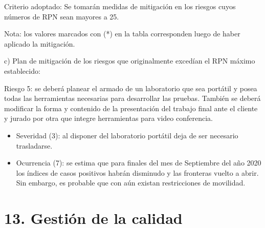 \documentclass[11pt]{charter}
\begin{document}
Criterio adoptado: 
Se tomarán medidas de mitigación en los riesgos cuyos números de RPN sean mayores a 25.

Nota: los valores marcados con (*) en la tabla corresponden luego de haber aplicado la mitigación.

c) Plan de mitigación de los riesgos que originalmente excedían el RPN máximo establecido:
 
Riesgo 5: se deberá planear el armado de un laboratorio que sea portátil y posea todas las herramientas necesarias para desarrollar las pruebas. También se deberá modificar la forma y contenido de la presentación del trabajo final ante el cliente y jurado por otra que integre herramientas para video conferencia.
\begin{itemize}
	\item Severidad (3): al disponer del laboratorio portátil deja de ser necesario trasladarse.
	\item Ocurrencia (7): se estima que para finales del mes de Septiembre del año 2020 los índices de casos positivos habrán disminudo y las fronteras vuelto a abrir. Sin embargo, es probable que con aún existan restricciones de movilidad.
\end{itemize}


\section{13. Gestión de la calidad}
\label{sec:calidad}
\end{document}
